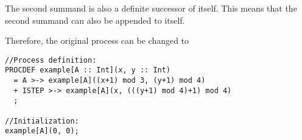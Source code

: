 The second summand is also a definite successor of itself.
This means that the second summand can also be appended to itself.

Therefore, the original process can be changed to

\begin{lstlisting}
//Process definition:
PROCDEF example[A :: Int](x, y :: Int)
  = A >-> example[A]((x+1) mod 3, (y+1) mod 4)
  + ISTEP >-> example[A](x, (((y+1) mod 4)+1) mod 4)
  ;

//Initialization:
example[A](0, 0);
\end{lstlisting}


